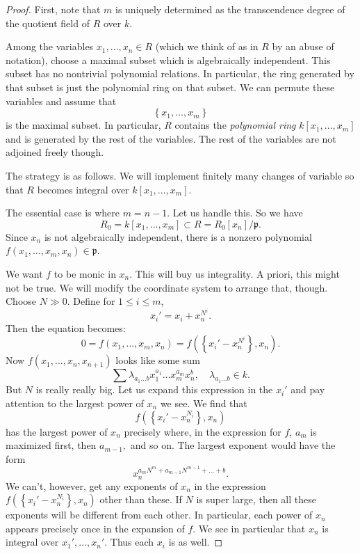 \begin{proof}
First, note that $m$ is uniquely determined as the transcendence degree of the
quotient field of $R$ over $k$.

Among the variables $x_1, \dots, x_n \in R$ (which we think of as in $R$ by an
abuse of notation), choose a maximal subset which is algebraically independent.
This subset has no nontrivial polynomial relations. In particular, the ring
generated by that subset is just the polynomial ring on that subset.
We can permute these variables and assume that
$$\left\{x_1,\dots, x_m\right\}$$ is the maximal subset. In particular, $R$
contains the \emph{polynomial ring} $k[x_1, \dots, x_m]$ and is generated by
the rest of the variables. The rest of the variables are not adjoined freely
though.

The strategy is as follows.  We will implement finitely many changes of
variable so that $R$ becomes integral over $k[x_1, \dots, x_m]$.

The essential case is where $m=n-1$. Let us handle this. So we have
\[ R_0 = k[x_1, \dots, x_m]  \subset R = R_0[x_n]/\mathfrak{p}.  \]
Since $x_n$ is not algebraically independent, there is a nonzero polynomial
$f(x_1, \dots, x_m, x_n) \in \mathfrak{p}$.

We want $f$ to be monic in $x_n$. This will buy us integrality. A priori, this
might not be true. We will modify the coordinate system to arrange that,
though. Choose $N \gg 0$. Define for $1 \leq i \leq m$,
\[ x_i' = x_i + x_n^{N^i}.  \]
Then the equation becomes:
\[ 0 = f(x_1, \dots, x_m, x_n) = f( \left\{x_i' - x_n^{N^i}\right\} , x_n). \]
Now $f(x_1, \dots, x_n, x_{n+1})$ looks like some sum
\[ \sum \lambda_{a_1 \dots b} x_1^{a_1} \dots x_m^{a_m} x_n^{b} , \quad
\lambda_{a_1 \dots b} \in k. \]
But $N$ is really really big. Let us expand this expression in the $x_i'$ and
pay attention to the largest power of $x_n$ we see.
We find that
\[ f(\left\{x_i' - x_n^{N_i}\right\},x_n)
\]
has the largest power of $x_n$ precisely where, in the expression for $f$,
$a_m$ is maximized first, then
$a_{m-1}, $ and so on. The largest exponent would have the form
\[ x_n^{a_m N^m + a_{m-1}N^{m-1} + \dots + b}.	\]
We can't, however, get any exponents of $x_n$ in the expression
\( f(\left\{x_i' - x_n^{N_i}\right\},x_n)\) other than these. If $N$ is super
large, then all these exponents will be different from each other.
In particular, each power of $x_n$ appears precisely once in the expansion of
$f$. We see in particular that $x_n$ is integral over $x_1', \dots, x_n'$.
Thus each $x_i$ is as well.


\end{proof}
